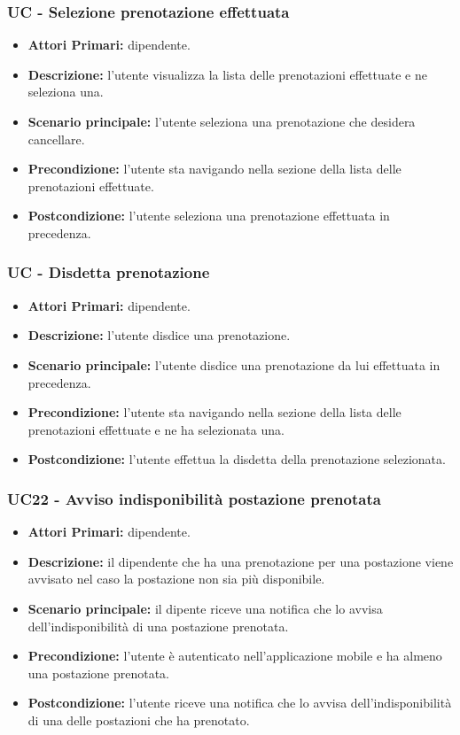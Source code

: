 \subsubsection{ UC - Selezione prenotazione effettuata}
\begin{itemize}
	\item\textbf{Attori Primari:} dipendente.
	\item\textbf{Descrizione:} l’utente visualizza la lista delle prenotazioni effettuate e ne seleziona una.
	\item\textbf{Scenario principale:} l’utente seleziona una prenotazione che desidera cancellare.
	\item\textbf{Precondizione:} l'utente sta navigando nella sezione della lista delle prenotazioni effettuate.
	\item\textbf{Postcondizione:} l’utente seleziona una prenotazione effettuata in precedenza.
\end{itemize}

\subsubsection{ UC - Disdetta prenotazione}
\begin{itemize}
	\item\textbf{Attori Primari:} dipendente.
	\item\textbf{Descrizione:} l’utente disdice una prenotazione. 
	\item\textbf{Scenario principale:} l’utente disdice una prenotazione da lui effettuata in precedenza.
	\item\textbf{Precondizione:} l'utente sta navigando nella sezione della lista delle prenotazioni effettuate e ne ha selezionata una.
	\item\textbf{Postcondizione:} l’utente effettua la disdetta della prenotazione selezionata.
\end{itemize}

\subsubsection{ UC22 - Avviso indisponibilità postazione prenotata }
\begin{itemize}
	\item\textbf{Attori Primari:} dipendente.
	\item\textbf{Descrizione:} il dipendente che ha una prenotazione per una postazione viene avvisato nel caso la postazione non sia più disponibile.
	\item\textbf{Scenario principale:} il dipente riceve una notifica che lo avvisa dell'indisponibilità di una postazione prenotata.
	\item\textbf{Precondizione:} l’utente è autenticato nell'applicazione mobile e ha almeno una postazione prenotata.
	\item\textbf{Postcondizione:} l'utente riceve una notifica che lo avvisa dell'indisponibilità di una delle postazioni che ha prenotato.
\end{itemize}



